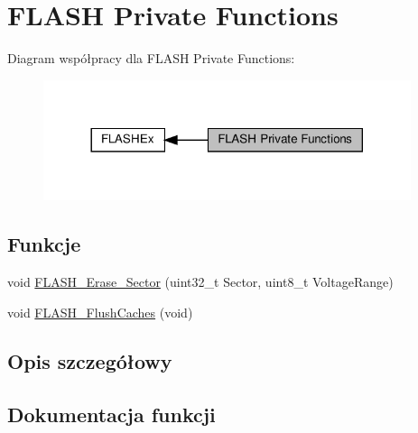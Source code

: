 \hypertarget{group___f_l_a_s_h_ex___private___functions}{}\section{F\+L\+A\+SH Private Functions}
\label{group___f_l_a_s_h_ex___private___functions}
Diagram współpracy dla F\+L\+A\+SH Private Functions\+:\nopagebreak
\begin{figure}[H]
\begin{center}
\leavevmode
\includegraphics[width=305pt]{group___f_l_a_s_h_ex___private___functions}
\end{center}
\end{figure}
\subsection*{Funkcje}
\begin{DoxyCompactItemize}
\item 
void \hyperlink{group___f_l_a_s_h_ex___private___functions_ga98c9d95cedcc4bfd39cdee82d07c0792}{F\+L\+A\+S\+H\+\_\+\+Erase\+\_\+\+Sector} (uint32\+\_\+t Sector, uint8\+\_\+t Voltage\+Range)
\item 
void \hyperlink{group___f_l_a_s_h_ex___private___functions_ga0881881ce55e54e123206bc2e0dc62f3}{F\+L\+A\+S\+H\+\_\+\+Flush\+Caches} (void)
\end{DoxyCompactItemize}


\subsection{Opis szczegółowy}


\subsection{Dokumentacja funkcji}
\mbox{\label{group___f_l_a_s_h_ex___private___functions_ga98c9d95cedcc4bfd39cdee82d07c0792}} 
